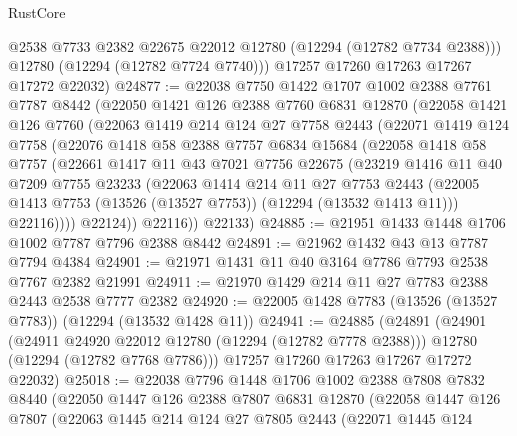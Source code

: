 \begin{lexlean}{RustCore}
\begin{coremodule}
          @2538
          @7733
          @2382
          @22675
          @22012
          @12780
          (@12294 (@12782 @7734 @2388)))
        @12780
        (@12294 (@12782 @7724 @7740)))
      @17257
      @17260
      @17263
      @17267
      @17272
      @22032)
@24877 := @22038
    @7750
    @1422
    @1707
    @1002
    @2388
    @7761
    @7787
    @8442
    (@22050
      @1421
      @126
      @2388
      @7760
      @6831
      @12870
      (@22058
        @1421
        @126
        @7760
        (@22063
          @1419
          @214
          @124
          @27
          @7758
          @2443
          (@22071
            @1419
            @124
            @7758
            (@22076
              @1418
              @58
              @2388
              @7757
              @6834
              @15684
              (@22058
                @1418
                @58
                @7757
                (@22661
                  @1417
                  @11
                  @43
                  @7021
                  @7756
                  @22675
                  (@23219
                    @1416
                    @11
                    @40
                    @7209
                    @7755
                    @23233
                    (@22063
                      @1414
                      @214
                      @11
                      @27
                      @7753
                      @2443
                      (@22005 @1413 @7753 (@13526 (@13527 @7753)) (@12294 (@13532 @1413 @11)))
                      @22116))))
              @22124))
          @22116))
      @22133)
@24885 := @21951 @1433 @1448 @1706 @1002 @7787 @7796 @2388 @8442
@24891 := @21962 @1432 @43 @13 @7787 @7794 @4384
@24901 := @21971 @1431 @11 @40 @3164 @7786 @7793 @2538 @7767 @2382 @21991
@24911 := @21970 @1429 @214 @11 @27 @7783 @2388 @2443 @2538 @7777 @2382
@24920 := @22005 @1428 @7783 (@13526 (@13527 @7783)) (@12294 (@13532 @1428 @11))
@24941 := @24885
    (@24891
      (@24901
        (@24911 @24920 @22012 @12780 (@12294 (@12782 @7778 @2388)))
        @12780
        (@12294 (@12782 @7768 @7786)))
      @17257
      @17260
      @17263
      @17267
      @17272
      @22032)
@25018 := @22038
    @7796
    @1448
    @1706
    @1002
    @2388
    @7808
    @7832
    @8440
    (@22050
      @1447
      @126
      @2388
      @7807
      @6831
      @12870
      (@22058
        @1447
        @126
        @7807
        (@22063
          @1445
          @214
          @124
          @27
          @7805
          @2443
          (@22071
            @1445
            @124

\end{coremodule}
\end{lexlean}
